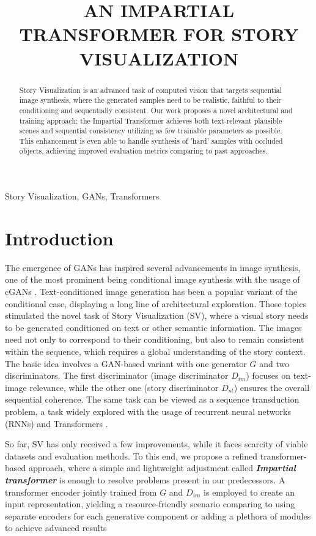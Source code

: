 \documentclass{article}
\title{AN IMPARTIAL TRANSFORMER FOR STORY VISUALIZATION}
\begin{document}
\maketitle
\begin{abstract}
Story Visualization is an advanced task of computed vision that targets sequential image synthesis, where the generated samples need to be realistic, faithful to their conditioning and sequentially consistent. Our work proposes a novel architectural and training approach: the Impartial Transformer achieves both text-relevant plausible scenes and sequential consistency utilizing as few trainable parameters as possible. This enhancement is even able to handle synthesis of 'hard' samples with occluded objects, achieving improved evaluation metrics comparing to past approaches.
\end{abstract}
\begin{keywords}
Story Visualization, GANs, Transformers
\end{keywords}
\section{Introduction}
\label{sec:intro}
The emergence of GANs \cite{goodfellow2014gans} has inspired several advancements in image synthesis, one of the most prominent being conditional image synthesis with the usage of cGANs \cite{odena2017conditional}. Text-conditioned image generation has been a popular variant of the conditional case, displaying a long line of architectural exploration. Those topics stimulated the novel task of Story Visualization (SV), where a visual story needs to be generated conditioned on text or other semantic information. The
images need not only to correspond to their conditioning,
but also to remain consistent within the sequence, which requires a global understanding of the story context. The basic idea involves a GAN-based variant with one generator $G$ and two discriminators. The first discriminator (image discriminator $D_{im}$) focuses on text-image relevance, while the other one (story discriminator $D_{st}$) ensures the overall sequential coherence. The same task can be viewed as a sequence transduction problem, a task widely explored with the usage of recurrent neural networks (RNNs) and Transformers \cite{transformer}.

So far, SV has only received a few improvements, while it faces  scarcity of viable datasets and evaluation methods. To this end, we propose a refined transformer-based approach, where a simple and lightweight adjustment called \textbf{\textit{Impartial transformer}}  is enough to resolve problems present in our predecessors. A transformer encoder jointly trained from $G$ and $D_{im}$ is employed to create an input representation, yielding a resource-friendly scenario comparing to using separate encoders for each generative component or adding a plethora of modules \cite{Maharana2021ImprovingGA, Maharana2021IntegratingVL} to achieve advanced results
\end{document}
